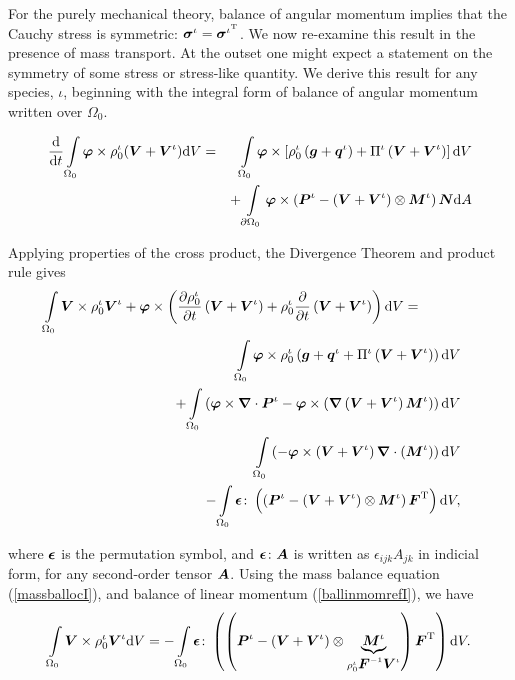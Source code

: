 For the purely mechanical theory, balance of
angular momentum implies that the Cauchy stress is symmetric:
$\mbox{\boldmath$\sigma$}^\iota = \mbox{\boldmath$\sigma$}^{\iota^\mathrm{T}}$. We now re-examine
this result in the presence of mass transport. At the outset one
might expect a statement on the symmetry of some stress or
stress-like quantity. We derive this result for any species,
$\iota$, beginning with the integral form of balance of angular
momentum written over $\Omega_0$.

\begin{eqnarray}
\frac{\mathrm{d}}{\mathrm{d}t} \int\limits_{\Omega_0} \mbox{\boldmath$\varphi$}
\times \rho^\iota_0(\mbox{\boldmath$ V$}+\mbox{\boldmath$ V$}^\iota)\mathrm{d}V &=&
\int\limits_{\Omega_0}\mbox{\boldmath$\varphi$}\times\left[\rho^\iota_0\left(\mbox{\boldmath$ g$}+\mbox{\boldmath$ q$}^\iota\right)+\Pi^\iota\left(\mbox{\boldmath$ V$}+\mbox{\boldmath$ V$}^\iota\right)\right]\mathrm{d}V\nonumber\\
& &+
\int\limits_{\partial\Omega_0}\mbox{\boldmath$\varphi$}\times\left(\mbox{\boldmath$ P$}^\iota-\left(\mbox{\boldmath$ V$}+\mbox{\boldmath$ V$}^\iota\right)\otimes\mbox{\boldmath$ M$}^\iota\right)\mbox{\boldmath$ N$}
\mathrm{d}A
\end{eqnarray}

\noindent Applying properties of the cross product, the Divergence
Theorem and product rule gives
\begin{eqnarray}
\int\limits_{\Omega_0}\mbox{\boldmath$ V$}\times\rho^\iota_0\mbox{\boldmath$ V$}^\iota +
\mbox{\boldmath$\varphi$}\times \left(\frac{\partial\rho^\iota_0}{\partial
t}\left(\mbox{\boldmath$ V$}+\mbox{\boldmath$ V$}^\iota\right)+ \rho^\iota_0\frac{\partial}{\partial
t}\left(\mbox{\boldmath$ V$}+\mbox{\boldmath$ V$}^\iota\right)\right)\mathrm{d}V =\qquad\quad& &\nonumber\\
\int\limits_{\Omega_0}\mbox{\boldmath$\varphi$}\times\rho^\iota_0\left(\mbox{\boldmath$ g$}+\mbox{\boldmath$ q$}^\iota+\Pi^\iota\left(\mbox{\boldmath$ V$}+\mbox{\boldmath$ V$}^\iota\right)\right)\mathrm{d}V& &\nonumber\\
 +
\int\limits_{\Omega_0}\left(\mbox{\boldmath$\varphi$}\times\mbox{\boldmath$\nabla$}\cdot\mbox{\boldmath$ P$}^\iota-\mbox{\boldmath$\varphi$}\times\left(\mbox{\boldmath$\nabla$}\left(\mbox{\boldmath$ V$}+\mbox{\boldmath$ V$}^\iota\right)\mbox{\boldmath$ M$}^\iota\right)\right)\mathrm{d}V
& &\nonumber\\
\int\limits_{\Omega_0}\left(-\mbox{\boldmath$\varphi$}\times\left(\mbox{\boldmath$ V$}+\mbox{\boldmath$ V$}^\iota\right)\mbox{\boldmath$\nabla$}\cdot\left(\mbox{\boldmath$ M$}^\iota\right)\right)
\mathrm{d}V & &\nonumber\\
-
\int\limits_{\Omega_0}\mbox{\boldmath$\epsilon$}\colon\left(\left(\mbox{\boldmath$ P$}^\iota-\left(\mbox{\boldmath$ V$}+\mbox{\boldmath$ V$}^\iota\right)\otimes\mbox{\boldmath$ M$}^\iota\right)\mbox{\boldmath$ F$}^\mathrm{T}\right)\mathrm{d}V,
\end{eqnarray}

\noindent where $\mbox{\boldmath$\epsilon$}$ is the permutation symbol, and
$\mbox{\boldmath$\epsilon$}\colon\mbox{\boldmath$ A$}$ is written as $\epsilon_{ijk}A_{jk}$ in
indicial form, for any second-order tensor $\mbox{\boldmath$ A$}$. Using the mass
balance equation (\ref{massballocI}), and balance of linear
momentum (\ref{ballinmomrefI}), we have
\begin{displaymath}
\int\limits_{\Omega_0}\mbox{\boldmath$ V$}\times\rho^\iota_0\mbox{\boldmath$ V$}^\iota\mathrm{d}V =
-\int\limits_{\Omega_0}\mbox{\boldmath$\epsilon$}\colon\left(\left(\mbox{\boldmath$ P$}^\iota-\left(\mbox{\boldmath$ V$}+\mbox{\boldmath$ V$}^\iota\right)\otimes\underbrace{\mbox{\boldmath$ M$}^\iota}_{\rho_0^\iota\mbox{\boldmath$ F$}^{-1}\mbox{\boldmath$ V$}^\iota}\right)\mbox{\boldmath$ F$}^\mathrm{T}\right)\mathrm{d}V.
\end{displaymath}

